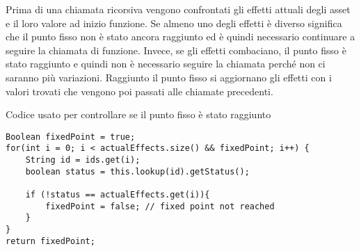 \documentclass[12pt,twoside,openright,a4paper]{report}
\begin{document}
Prima di una chiamata ricorsiva vengono confrontati gli effetti attuali degli asset e il loro valore ad inizio funzione. Se almeno uno degli effetti è diverso significa che il punto fisso non è stato ancora raggiunto ed è quindi necessario continuare a seguire la chiamata di funzione.
\newline Invece, se gli effetti combaciano, il punto fisso è stato raggiunto e quindi non è necessario seguire la chiamata perché non ci saranno più variazioni.
\newline Raggiunto il punto fisso si aggiornano gli effetti con i valori trovati che vengono poi passati alle chiamate precedenti.

Codice usato per controllare se il punto fisso è stato raggiunto 
\begin{lstlisting}
Boolean fixedPoint = true;
for(int i = 0; i < actualEffects.size() && fixedPoint; i++) {
    String id = ids.get(i);
    boolean status = this.lookup(id).getStatus();
    
    if (!status == actualEffects.get(i)){               
        fixedPoint = false; // fixed point not reached
    }
}
return fixedPoint;
\end{lstlisting}
\end{document}

